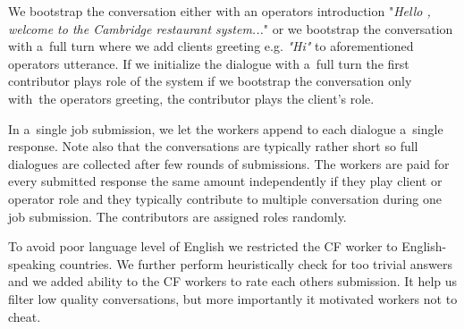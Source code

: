 \documentclass[runningheads,a4paper]{llncs}
\begin{document}
We bootstrap the conversation either with an operators introduction "{\it Hello , welcome to the Cambridge restaurant system...}" or we bootstrap the conversation with a~full turn where we add clients greeting e.g. {\it "Hi"} to aforementioned operators utterance.
If we initialize the dialogue with a~full turn the first contributor plays role of the system if we bootstrap the conversation only with~the operators greeting, the contributor plays the client's role.

In a~single job submission, we let the workers append to each dialogue a~single response.
Note also that the conversations are typically rather short so full dialogues are collected after few rounds of submissions.
The workers are paid for every submitted response the same amount independently if they play client or operator role and they typically contribute to multiple conversation during one job submission.
The contributors are assigned roles randomly.

To avoid poor language level of English we restricted the CF worker to English-speaking countries.
We further perform heuristically check for too trivial answers and we added ability to the CF workers to rate each others submission.
It help us filter low quality conversations, but more importantly it motivated workers not to cheat.
\end{document}
